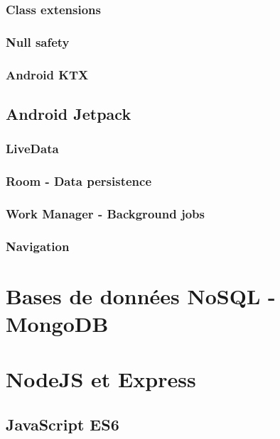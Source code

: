 \documentclass[11pt,a4paper]{report}
\begin{document}
\subsection{Class extensions}
\subsection{Null safety}

\subsection{Android KTX}
\section{Android Jetpack}
\subsection{LiveData}
\subsection{Room - Data persistence}
\subsection{Work Manager - Background jobs}
\subsection{Navigation}







\chapter{Bases de données NoSQL - MongoDB}
\chapter{NodeJS et Express}
\section{JavaScript ES6}
\end{document}
